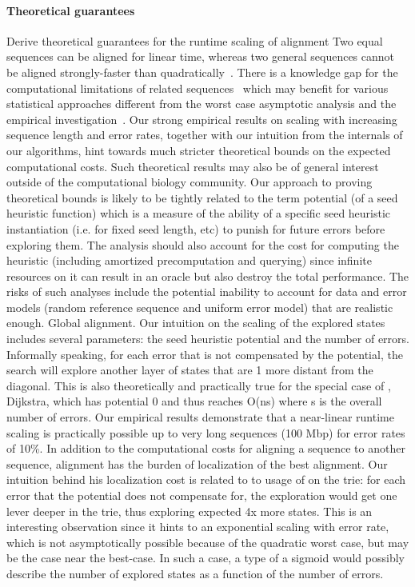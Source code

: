 \paragraph{Theoretical guarantees}
Derive theoretical guarantees for the runtime scaling of \A alignment Two equal
sequences can be aligned for linear time, whereas two general sequences cannot
be aligned strongly-faster than quadratically~\citep{backurs2015edit}. There is
a knowledge gap for the computational limitations of related
sequences~\citep{medvedev2022limitations} which may benefit for various
statistical approaches different from the worst case asymptotic analysis and the
empirical investigation~\citep{medvedev2022theoretical}. Our strong empirical
results on scaling with increasing sequence length and error rates, together
with our intuition from the internals of our \A algorithms, hint towards much
stricter theoretical bounds on the expected computational costs. Such
theoretical results may also be of general interest outside of the computational
biology community. Our approach to proving theoretical bounds is likely to be
tightly related to the term potential (of a seed heuristic function) which is a
measure of the ability of a specific seed heuristic instantiation (i.e. for
fixed seed length, etc) to punish for future errors before exploring them. The
analysis should also account for the cost for computing the heuristic (including
amortized precomputation and querying) since infinite resources on it can result
in an oracle but also destroy the total performance. The risks of such analyses
include the potential inability to account for data and error models (random
reference sequence and uniform error model) that are realistic enough. Global
alignment. Our intuition on the scaling of the explored states includes several
parameters: the seed heuristic potential and the number of errors. Informally
speaking, for each error that is not compensated by the potential, the \A search
will explore another layer of states that are 1 more distant from the diagonal.
This is also theoretically and practically true for the special case of \A,
Dijkstra, which has potential 0 and thus reaches O(ns) where s is the overall
number of errors. Our empirical results demonstrate that a near-linear runtime
scaling is practically possible up to very long sequences (100 Mbp) for error
rates of 10\%. In addition to the computational costs for aligning a sequence to
another sequence, alignment has the burden of localization of the best
alignment. Our intuition behind his localization cost is related to to usage of
\A on the trie: for each error that the \A potential does not compensate for,
the exploration would get one lever deeper in the trie, thus exploring expected
4x more states. This is an interesting observation since it hints to an
exponential scaling with error rate, which is not asymptotically possible
because of the quadratic worst case, but may be the case near the best-case. In
such a case, a type of a sigmoid would possibly describe the number of explored
states as a function of the number of errors.

